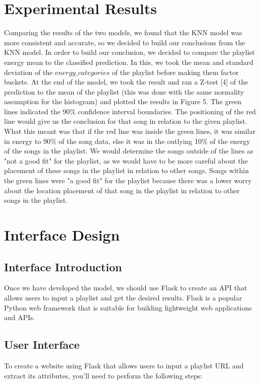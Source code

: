 \documentclass[titlepage]{article}
\begin{document}
\section{Experimental Results}
Comparing the results of the two models, we found that the KNN model was more consistent and accurate, so we decided to build our conclusions from the KNN model. In order to build our conclusion, we decided to compare the playlist energy mean to the classified prediction. In this, we took the mean and standard deviation of the $energy\_categories$ of the playlist before making them factor buckets. At the end of the model, we took the result and ran a Z-test [4] of the prediction to the mean of the playlist (this was done with the same normality assumption for the histogram) and plotted the results in Figure 5. The green lines indicated the 90\% confidence interval boundaries. The positioning of the red line would give us the conclusion for that song in relation to the given playlist. What this meant was that if the red line was inside the green lines, it was similar in energy to 90\% of the song data, else it was in the outlying 10\% of the energy of the songs in the playlist. We would determine the songs outside of the lines as "not a good fit" for the playlist, as we would have to be more careful about the placement of these songs in the playlist in relation to other songs. Songs within the green lines were "a good fit" for the playlist because there was a lower worry about the location placement of that song in the playlist in relation to other songs in the playlist.

\section{Interface Design}
\subsection{Interface Introduction}
Once we have developed the model, we should use Flask to create an API that allows users to input a playlist and get the desired results. Flask is a popular Python web framework that is suitable for building lightweight web applications and APIs.

\subsection{User Interface}
To create a website using Flask that allows users to input a playlist URL and extract its attributes, you'll need to perform the following steps:
\end{document}
